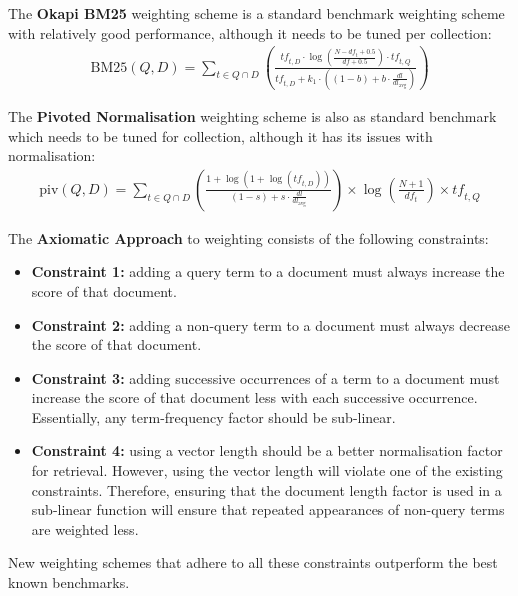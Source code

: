 \documentclass[a4paper,11pt]{article}
\begin{document}
The \textbf{Okapi BM25} weighting scheme is a standard benchmark weighting scheme with relatively good performance, although it needs to be tuned per collection:
\begin{align*}
    \text{BM25}(Q,D) = \sum_{t \in Q \cap D} \left( \frac{\textit{tf}_{t,D} \cdot \log \left( \frac{N - \textit{df}_t + 0.5}{\textit{df} + 0.5} \right) \cdot \textit{tf}_{t, Q}}{\textit{tf}_{t,D} + k_1 \cdot \left( (1-b) + b \cdot \frac{\textit{dl}}{\textit{dl}_\text{avg}} \right)} \right)
\end{align*}

The \textbf{Pivoted Normalisation} weighting scheme is also as standard benchmark which needs to be tuned for collection, although it has its issues with normalisation:
\begin{align*}
    \text{piv}(Q,D) = \sum_{t \in Q \cap D} \left( \frac{1 + \log \left( 1 + \log \left( \textit{tf}_{t, D} \right) \right)}{(1 - s) + s \cdot \frac{\textit{dl}}{\textit{dl}_\text{avg}}} \right) \times \log \left( \frac{N+1}{\textit{df}_t} \right) \times \textit{tf}_{t, Q}
\end{align*}

The \textbf{Axiomatic Approach} to weighting consists of the following constraints:
\begin{itemize}
    \item   \textbf{Constraint 1:} adding a query term to a document must always increase the score of that document.
    \item   \textbf{Constraint 2:} adding a non-query term to a document must always decrease the score of that document.
    \item   \textbf{Constraint 3:} adding successive occurrences of a term to a document must increase the score of that document less with each successive occurrence.
            Essentially, any term-frequency factor should be sub-linear.
    \item   \textbf{Constraint 4:} using a vector length should be a better normalisation factor for retrieval.
            However, using the vector length will violate one of the existing constraints.
            Therefore, ensuring that the document length factor is used in a sub-linear function will ensure that repeated appearances of non-query terms are weighted less.
\end{itemize}

New weighting schemes that adhere to all these constraints outperform the best known benchmarks.
\end{document}
